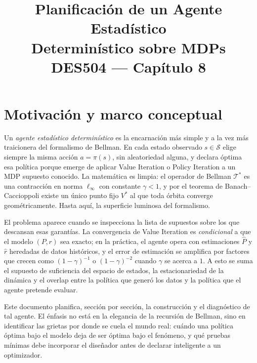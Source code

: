 \documentclass[12pt, a4paper]{article}
\title{%
  \textbf{Planificación de un Agente Estadístico}\\[4pt]
  \textbf{Determinístico sobre MDPs}\\[8pt]
  \large DES504 --- Capítulo 8%
}
\author{}
\date{}
\theoremstyle{plain}
\theoremstyle{definition}
\newcommand{\cT}{\mathcal{T}}
\newcommand{\cS}{\mathcal{S}}
\newcommand{\Vopt}{V^{*}}
\newcommand{\Phat}{\widehat{P}}
\newcommand{\rhat}{\widehat{r}}
\begin{document}

\maketitle
\thispagestyle{empty}

\section{Motivación y marco conceptual}

Un \emph{agente estadístico determinístico} es la encarnación más simple y a
la vez más traicionera del formalismo de Bellman. En cada estado observado
$s\in\cS$ elige siempre la misma acción $a=\pi(s)$, sin aleatoriedad
alguna, y declara óptima esa política porque emerge de aplicar Value
Iteration o Policy Iteration a un MDP supuesto conocido. La matemática es
limpia: el operador de Bellman $\cT^{*}$ es una contracción en norma
$\ell_\infty$ con constante $\gamma<1$, y por el teorema de
Banach--Caccioppoli existe un único punto fijo $\Vopt$ al que toda órbita
converge geométricamente. Hasta aquí, la superficie luminosa del
formalismo.

El problema aparece cuando se inspecciona la lista de supuestos sobre los
que descansan esas garantías. La convergencia de Value Iteration es
\emph{condicional} a que el modelo $(P,r)$ sea exacto; en la práctica, el
agente opera con estimaciones $\Phat$ y $\rhat$ heredadas de datos
históricos, y el error de estimación se amplifica por factores que crecen
como $(1-\gamma)^{-1}$ o $(1-\gamma)^{-2}$ cuando $\gamma$ se acerca a
$1$. A esto se suma el supuesto de suficiencia del espacio de estados, la
estacionariedad de la dinámica y el overlap entre la política que generó
los datos y la política que el agente pretende evaluar.

Este documento planifica, sección por sección, la construcción y el
diagnóstico de tal agente. El énfasis no está en la elegancia de la
recursión de Bellman, sino en identificar las grietas por donde se cuela
el mundo real: cuándo una política óptima bajo el modelo deja de ser
óptima bajo el fenómeno, y qué pruebas mínimas debe incorporar el
diseñador antes de declarar inteligente a un optimizador.

\end{document}
